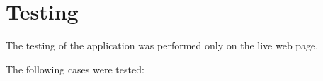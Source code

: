 \chapter{Testing}\label{ch:testing} %

The testing of the application was performed only on the live web page.

The following cases were tested:


